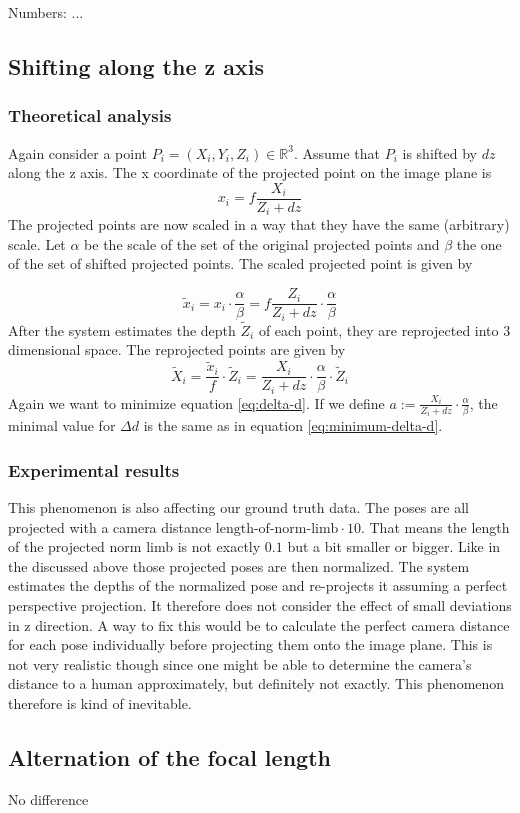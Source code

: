 	Numbers: ...
	
\subsection{Shifting along the z axis}
\label{sec:z-shift-error}
\subsubsection{Theoretical analysis}
Again consider a point $P_i=(X_i, Y_i, Z_i) \in \mathbb{R}^3$. Assume that $P_i$ is shifted by $dz$ along the z axis.
The x coordinate of the projected point on the image plane is
\begin{equation}
	x_i = f \frac{X_i}{Z_i + dz}
\end{equation}
The projected points are now scaled in a way that they have the same (arbitrary) scale.  Let $\alpha$ be the scale of the set of the original projected points and $\beta$ the one of the set of shifted projected points. The scaled projected point is given by

\begin{equation}
		\widetilde{x}_i = x_i \cdot \frac{\alpha}{\beta} 
		= f \frac{Z_i}{Z_i + dz}\cdot \frac{\alpha}{\beta} 
\end{equation}
After the system estimates the depth $\widetilde{Z}_i$ of each point, they are reprojected into 3 dimensional space.
The reprojected points are given by
\begin{equation}
	\widetilde{X}_i = \frac{\widetilde{x}_i}{f} \cdot \widetilde{Z}_i
	= \frac{X_i}{Z_i + dz}\cdot \frac{\alpha}{\beta}  \cdot \widetilde{Z}_i
\end{equation}
Again we want to minimize equation \eqref{eq:delta-d}.
If we define $a := \frac{X_i}{Z_i + dz}\cdot \frac{\alpha}{\beta}$, the minimal value for $\Delta d$ is the same as in equation \eqref{eq:minimum-delta-d}.


\subsubsection{Experimental results}
	This phenomenon is also affecting our ground truth data. The poses are all projected with a camera distance $ \text{length-of-norm-limb} \cdot 10$. 
	That means the length of the projected norm limb is not exactly $0.1$ but a bit smaller or bigger. 
	Like in the discussed above those projected poses are then normalized. 
	The system estimates the depths of the normalized pose and re-projects it assuming a perfect perspective projection. 
	It therefore does not consider the effect of small deviations in z direction.
	A way to fix this would be to calculate the perfect camera distance for each pose individually before projecting them onto the image plane.
	This is not very realistic though since one might be able to determine the camera's distance to a human approximately, but definitely not exactly. This phenomenon therefore is kind of inevitable.


\subsection{Alternation of the focal length}
No difference

